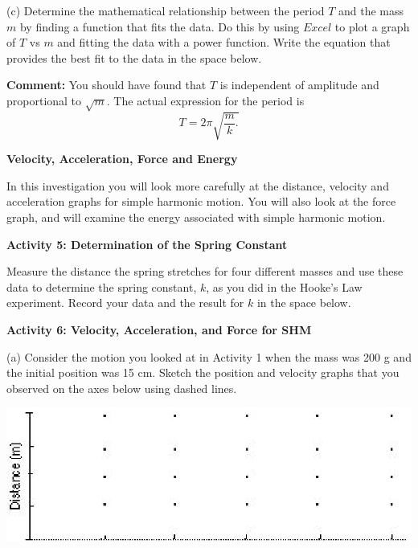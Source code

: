 (c) Determine the mathematical relationship between the period $T$ and the mass
$m$ by finding a function that fits the data. Do this by using $Excel$ to plot a graph of $T$ vs $m$ and fitting the data with a power function. Write the equation that provides the best fit to the data in the space below.
\vspace{20mm}

\textbf{Comment:} You should have found that $T$ is independent of amplitude and proportional to \( \sqrt{m} \). The actual expression for the period is
\[T=2\pi \sqrt{\frac{m}{k}.}\]


\textbf{Velocity, Acceleration, Force and Energy }

In this investigation you will look more carefully at the distance, velocity
and acceleration graphs for simple harmonic motion. You will also look at the
force graph, and will examine the energy associated with simple harmonic motion.

\textbf{Activity 5: Determination of the Spring Constant }

Measure the distance the spring stretches for four different masses and use
these data to determine the spring constant, $k$, as you did in the Hooke's Law experiment. Record your data and the result for $k$ in the space below.
\vspace{40mm}

\textbf{Activity 6: Velocity, Acceleration, and Force for SHM} 

(a) Consider the motion you looked at in Activity 1 when the mass was 200 g
and the initial position was 15 cm. Sketch the position and velocity graphs
that you observed on the axes below using dashed lines.

\vspace{0.3cm}
{\par\centering \includegraphics{periodic_motion_fig2.eps} \par}
\vspace{0.3cm}

